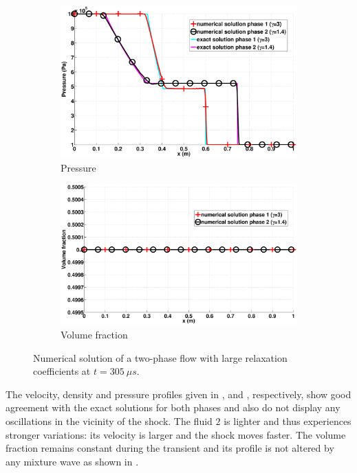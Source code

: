\documentclass[preprint,10pt]{elsarticle}
\begin{document}
\begin{figure}[H]
        \begin{subfigure}[b]{0.495\textwidth}
                \centering
                \includegraphics[width=\textwidth]{figures/two_phases_pressure.eps}
                \caption{Pressure}
                \label{fig:indp-phase-press}
        \end{subfigure}        
        \begin{subfigure}[b]{0.495\textwidth}
                \centering
                \includegraphics[width=\textwidth]{figures/two_phases_volume_fraction.eps}
                \caption{Volume fraction}
                \label{fig:indp-phase-vf}
        \end{subfigure}
        \caption{Numerical solution of a two-phase flow with large relaxation coefficients at $t=305 \ \mu s$.}\label{fig:indp-phase-variables}
\end{figure}
%
The velocity, density and pressure profiles given in ,  and , respectively, show good agreement with the exact solutions for both phases and also do not display any oscillations in the vicinity of the shock. The fluid $2$ is lighter and thus experiences stronger variations: its velocity is larger and the shock moves faster. The volume fraction remains constant during the transient and its profile is not altered by any mixture wave as shown in .
\end{document}
